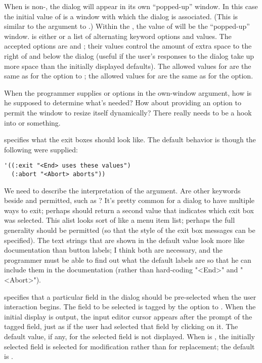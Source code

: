 When  is non-, the dialog will appear in its own
``popped-up'' window.  In this case the initial value of  is a
window with which the dialog is associated.  (This is similar to the
 argument to .)  Within the ,
the value of  will be the ``popped-up'' window.   is
either  or a list of alternating keyword options and values.  The accepted
options are  and ; their values control the
amount of extra space to the right of and below the dialog (useful if the user's
responses to the dialog take up more space than the initially displayed
defaults).  The allowed values for  are the same as for the
 option to ; the allowed values for
 are the same as for the  option.

 {When the programmer supplies  or
 options in the own-window argument, how is he supposed to
determine what's needed?  How about providing an option to permit the window to
resize itself dynamically?  There really needs to be a hook into
 or something.}

 specifies what the exit boxes should look like.  The default
behavior is though the following were supplied:

\begin{verbatim}
'((:exit "<End> uses these values")
  (:abort "<Abort> aborts"))
\end{verbatim}

 {We need to describe the interpretation of the 
argument.  Are other keywords beside  and  permitted, such
as ?  It's pretty common for a dialog to have multiple ways to exit;
perhaps  should return a second value that indicates which
exit box was selected.  This alist looks sort of like a menu item list; perhaps
the full generality should be permitted (so that the style of the exit box
messages can be specified).  The text strings that are shown in the default
value look more like documentation than button labels; I think both are
necessary, and the programmer must be able to find out what the default labels
are so that he can include them in the documentation (rather than hard-coding
"<End>" and "<Abort>").}

 specifies that a particular field in the
dialog should be pre-selected when the user interaction begins. The field to be
selected is tagged by the  option to .  When
the initial display is output, the input editor cursor appears after the prompt
of the tagged field, just as if the user had selected that field by clicking on
it.  The default value, if any, for the selected field is not displayed.  When
 is , the initially selected field is
selected for modification rather than for replacement; the default is .

